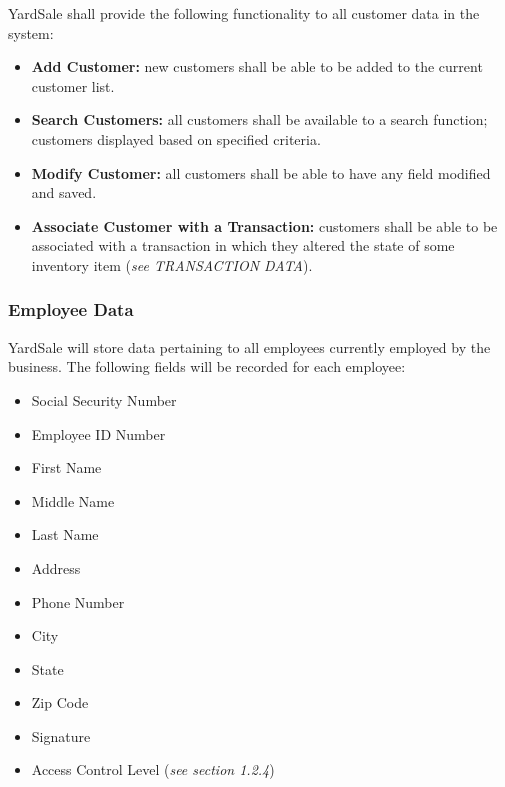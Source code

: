 \documentclass{report}
\begin{document}
                \noindent YardSale shall provide the following functionality
                to all customer data in the system:

                \begin{itemize}
                    \item {\bf Add Customer:} new customers shall
                    be able to be added to the current customer
                    list.
                    \item {\bf Search Customers:} all customers
                     shall be available to a search function;
                    customers displayed based on specified criteria.
                    \item {\bf Modify Customer:} all customers
                    shall be able to have any field modified and
                    saved.
                    \item {\bf Associate Customer with a Transaction:}
                    customers shall be able to be
                    associated with a transaction in which they
                    altered the state of some inventory item ({\sl see
                    TRANSACTION DATA}).
                \end{itemize}

            \subsubsection{Employee Data}
                YardSale will store data pertaining to all
                employees currently employed by the business.
                The following fields will be recorded for each
                employee:

                \begin{itemize}
                    \item Social Security Number
                    \item Employee ID Number
                    \item First Name
                    \item Middle Name
                    \item Last Name
                    \item Address
                    \item Phone Number
                    \item City
                    \item State
                    \item Zip Code
                    \item Signature
                    \item Access Control Level ({\sl see section
                    1.2.4})
                \end{itemize}
\end{document}

